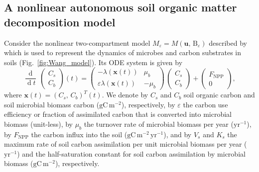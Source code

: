 \documentclass[smallextended]{svjour3}
\renewcommand{\tens}[1]{\mathrm{#1}}
\renewcommand{\vec}[1]{\mathbf{#1}}
\newcommand{\deriv}[1]{\frac{\operatorname{d}}{\operatorname{d}#1}}
\newcommand{\gC}{\mathrm{gC}}
\newcommand{\yr}{\mathrm{yr}}
\newcommand{\meter}{\mathrm{m}}
\newcommand{\transpose}{T}
\newcommand{\NPP}{\ensuremath{\mathrm{NPP}}}
\begin{document}
\subsection{A nonlinear autonomous soil organic matter decomposition model}
\label{sec:example_2}
Consider the nonlinear two-compartment model $M_\varepsilon=M(\vec{u},\,\tens{B}_\varepsilon)$ described by \citet{Wang2014BG} which is used to represent the dynamics of microbes and carbon substrates in soils (Fig.~\ref{fig:Wang_model}). Its ODE system is given by
\begin{equation}
    \deriv{t}\,\begin{pmatrix}C_{s}\\C_{b}\end{pmatrix}(t) = 
    \begin{pmatrix}
      -\lambda(\vec{x}(t)) & \mu_{b}\\
      \varepsilon \lambda(\vec{x}(t)) & - \mu_{b}
    \end{pmatrix}
    \, \begin{pmatrix}C_{s}\\C_{b}\end{pmatrix}
    + \begin{pmatrix}F_{\NPP}\\0\end{pmatrix},
\end{equation}
where $\vec{x}(t)=(C_{s},\,C_{b})^{\transpose}(t)$.
We denote by $C_s$ and $C_b$ soil organic carbon and soil microbial biomass carbon ($\gC\,\meter^{-2}$), respectively, by $\varepsilon$ the carbon use efficiency or fraction of assimilated carbon that is converted into microbial biomass (unit-less), by $\mu_b$ the turnover rate of microbial biomass per year ($\yr^{-1}$), by $F_{\NPP}$ the carbon influx into the soil ($\gC\,\meter^{-2}\,\yr^{-1}$), and by $V_s$ and $K_s$ the maximum rate of soil carbon assimilation per unit microbial biomass per year ($\yr^{-1}$) and the half-saturation constant for soil carbon assimilation by microbial biomass ($\gC\,\meter^{-2}$), respectively.
\end{document}
